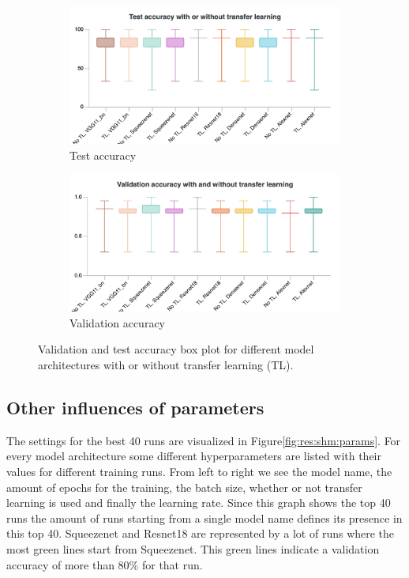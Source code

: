 \begin{figure}[hbtp]
	\begin{subfigure}{0.6\textwidth}
		\centering
		\includegraphics[width=\linewidth]{fig/results/wandb/second_handmade_sweep/charts/Section-13-Panel-1-nk6ghsz6f.png}
		\caption{Test accuracy}
		\label{fig:res:shm:tl:ta}
	\end{subfigure}
	\begin{subfigure}{0.6\textwidth}
		\centering
		\includegraphics[width=\linewidth]{fig/results/wandb/second_handmade_sweep/charts/Section-13-Panel-0-hqve9y31m.png}
		\caption{Validation accuracy}
		\label{fig:res:shm:tl:va}
	\end{subfigure}
	\caption{Validation and test accuracy box plot for different model architectures with or without transfer learning (TL).}
	\label{fig:res:shm:tl}
\end{figure}

\subsection{Other influences of parameters}
The settings for the best 40 runs are visualized in Figure\ref{fig:res:shm:params}. For every model architecture some different hyperparameters are listed with their values for different training runs. From left to right we see the model name, the amount of epochs for the training, the batch size, whether or not transfer learning is used and finally the learning rate. Since this graph shows the top 40 runs the amount of runs starting from a single model name defines its presence in this top 40. Squeezenet and Resnet18 are represented by a lot of runs where the most green lines start from Squeezenet. This green lines indicate a validation accuracy of more than 80\% for that run.

